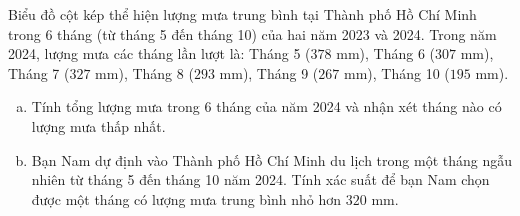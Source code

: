 \begin{bt}%
Biểu đồ cột kép thể hiện lượng mưa trung bình tại Thành phố Hồ Chí Minh trong 6 tháng (từ tháng 5 đến tháng 10) của hai năm 2023 và 2024. Trong năm 2024, lượng mưa các tháng lần lượt là: Tháng 5 ($378\text{ mm}$), Tháng 6 ($307\text{ mm}$), Tháng 7 ($327\text{ mm}$), Tháng 8 ($293\text{ mm}$), Tháng 9 ($267\text{ mm}$), Tháng 10 ($195\text{ mm}$).
\begin{enumerate}[a)]
	\item Tính tổng lượng mưa trong $6$ tháng của năm 2024 và nhận xét tháng nào có lượng mưa thấp nhất.
	\item Bạn Nam dự định vào Thành phố Hồ Chí Minh du lịch trong một tháng ngẫu nhiên từ tháng 5 đến tháng 10 năm 2024. Tính xác suất để bạn Nam chọn được một tháng có lượng mưa trung bình nhỏ hơn $320\text{ mm}$.
\end{enumerate}
\end{bt}

